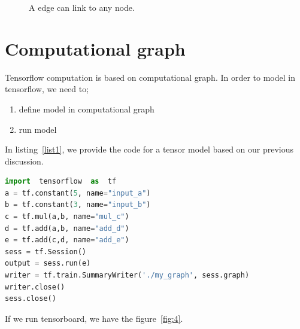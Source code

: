 \documentclass[vecarrow]{svproc}
\begin{document}
\begin{figure}
\caption{A edge can link to any node.}
\label{fig:3}
\end{figure}


\section{Computational graph}

Tensorflow computation is based on computational graph. In order to model in tensorflow, we need to;
\begin{enumerate}
\item define model in computational graph
\item run model
\end{enumerate}

In listing~\ref{list1}, we provide the code for a tensor model based on our previous discussion.

\renewcommand{\thelstlisting}{\arabic{lstlisting}}

\begin{lstlisting}[language=Python,
caption={an example of tensorflow model},label={list1}]
import	tensorflow	as	tf
a =	tf.constant(5, name="input_a")
b =	tf.constant(3, name="input_b")
c =	tf.mul(a,b, name="mul_c")
d =	tf.add(a,b, name="add_d")
e = tf.add(c,d, name="add_e")
sess = tf.Session()
output = sess.run(e)
writer = tf.train.SummaryWriter('./my_graph', sess.graph)
writer.close()
sess.close()
\end{lstlisting}

If we run tensorboard, we have the figure~\ref{fig:4}.
\end{document}
